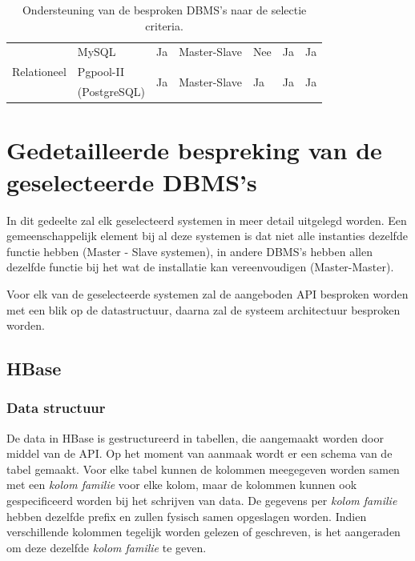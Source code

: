 \begin{table}[htbp]
{\begin{tabular}{ll|lllll}
          \hline
    \multirow{3}[0]{*}{Relationeel} & MySQL & Ja    & Master-Slave & Nee   & Ja    & Ja \\
          & Pgpool-II & \multicolumn{1}{l}{\multirow{2}[0]{*}{Ja}} & \multicolumn{1}{l}{\multirow{2}[0]{*}{Master-Slave}} & \multicolumn{1}{l}{\multirow{2}[0]{*}{Ja}} & \multicolumn{1}{l}{\multirow{2}[0]{*}{Ja}} & \multicolumn{1}{l}{\multirow{2}[0]{*}{Ja}} \\
          & (PostgreSQL) & \multicolumn{1}{l}{} & \multicolumn{1}{l}{} & \multicolumn{1}{l}{} & \multicolumn{1}{l}{} & \multicolumn{1}{l}{} \\
    \end{tabular}%
    }
    \caption{Ondersteuning van de besproken DBMS's naar de selectie criteria. }
  \label{table:vergelijkingNosql}%
\end{table}%





\section{Gedetailleerde bespreking van de geselecteerde DBMS's}
In dit gedeelte zal elk geselecteerd systemen in meer detail uitgelegd worden. Een gemeenschappelijk element bij al deze systemen is dat niet alle instanties dezelfde functie hebben (Master - Slave systemen), in andere DBMS's hebben allen dezelfde functie bij het wat de installatie kan vereenvoudigen (Master-Master). 

Voor elk van de geselecteerde systemen zal de aangeboden API besproken worden met een blik op de datastructuur, daarna zal de systeem architectuur besproken worden. 

\subsection{HBase}

\subsubsection{Data structuur}
De data in HBase is gestructureerd in tabellen, die aangemaakt worden door middel van de API. Op het moment van aanmaak wordt er een schema van de tabel gemaakt. Voor elke tabel kunnen de kolommen meegegeven worden samen met een \textit{kolom familie} voor elke kolom, maar de kolommen kunnen ook gespecificeerd worden bij het schrijven van data. De gegevens per \textit{kolom familie} hebben dezelfde prefix en zullen fysisch samen opgeslagen worden. Indien verschillende kolommen tegelijk worden gelezen of geschreven, is het aangeraden om deze dezelfde \textit{kolom familie} te geven. 


